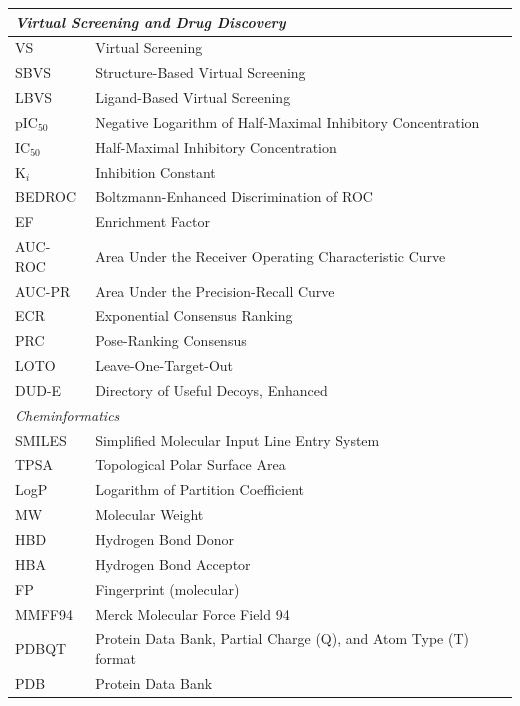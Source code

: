 \documentclass[conference]{IEEEtran}
\begin{document}
\begin{table}[!htbp]
{\begin{tabular}{p{2.2cm} p{6.2cm}}
\midrule
\multicolumn{2}{l}{\textit{Virtual Screening and Drug Discovery}} \\
\midrule
VS         & Virtual Screening \\
SBVS       & Structure-Based Virtual Screening \\
LBVS       & Ligand-Based Virtual Screening \\
pIC$_{50}$ & Negative Logarithm of Half-Maximal
             Inhibitory Concentration \\
IC$_{50}$  & Half-Maximal Inhibitory Concentration \\
K$_i$      & Inhibition Constant \\
BEDROC     & Boltzmann-Enhanced Discrimination of ROC \\
EF         & Enrichment Factor \\
AUC-ROC    & Area Under the Receiver Operating
             Characteristic Curve \\
AUC-PR     & Area Under the Precision-Recall Curve \\
ECR        & Exponential Consensus Ranking \\
PRC        & Pose-Ranking Consensus \\
LOTO       & Leave-One-Target-Out \\
DUD-E      & Directory of Useful Decoys, Enhanced \\

\midrule
\multicolumn{2}{l}{\textit{Cheminformatics}} \\
\midrule
SMILES     & Simplified Molecular Input Line Entry System \\
TPSA       & Topological Polar Surface Area \\
LogP       & Logarithm of Partition Coefficient \\
MW         & Molecular Weight \\
HBD        & Hydrogen Bond Donor \\
HBA        & Hydrogen Bond Acceptor \\
FP         & Fingerprint (molecular) \\
MMFF94     & Merck Molecular Force Field 94 \\
PDBQT      & Protein Data Bank, Partial Charge (Q), and
             Atom Type (T) format \\
PDB        & Protein Data Bank \\


\end{tabular}}
\end{table}
\end{document}

